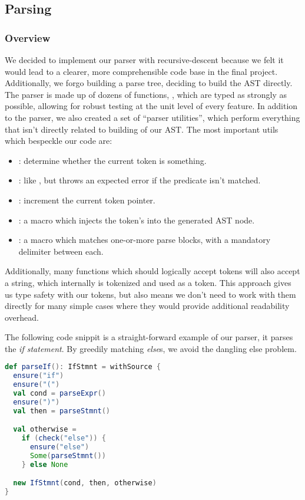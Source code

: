 \documentclass{article}
\begin{document}
\subsection{Parsing}

\subsubsection{Overview}

We decided to implement our parser with recursive-descent because we felt it would lead to a clearer, more
comprehensible code base in the final project. Additionally, we forgo building a parse tree, deciding to build the AST
directly. The parser is made up of dozens of functions, , which are typed as strongly as possible,
allowing for robust testing at the unit level of every feature. In addition to the parser, we also created a set of
``parser utilities'', which perform everything that isn't directly related to building of our AST. The most important
utils which bespeckle our code are:

\begin{itemize}
    \item {}: determine whether the current token is something.
    \item {}: like , but throws an expected error if the predicate isn't matched.
    \item {}: increment the current token pointer.
    \item {}: a macro which injects the token's  into the generated AST node.
    \item {}: a macro which matches one-or-more parse blocks, with a mandatory delimiter between each.
\end{itemize}

Additionally, many functions which should logically accept tokens will also accept a string, which internally is
tokenized and used as a token. This approach gives us type safety with our tokens, but also means we don't need to work
with them directly for many simple cases where they would provide additional readability overhead.

The following code snippit is a straight-forward example of our parser, it parses the \emph{if statement}. By greedily
matching \emph{else}s, we avoid the dangling else problem.

\begin{lstlisting}[language=Scala]
def parseIf(): IfStmnt = withSource {
  ensure("if")
  ensure("(")
  val cond = parseExpr()
  ensure(")")
  val then = parseStmnt()

  val otherwise =
    if (check("else")) {
      ensure("else")
      Some(parseStmnt())
    } else None

  new IfStmnt(cond, then, otherwise)
}
\end{lstlisting}
\end{document}
